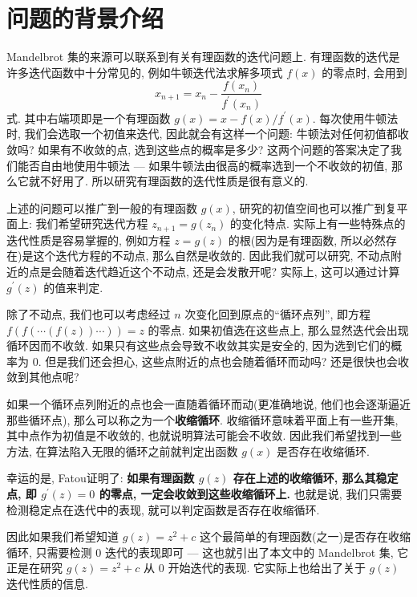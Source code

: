 \documentclass{ctexart}
\begin{document}
\section{问题的背景介绍} %
\label{sec:问题的背景介绍}
Mandelbrot 集的来源可以联系到有关有理函数的迭代问题上. 有理函数的迭代是许多迭代函数中十分常见的, 例如牛顿迭代法求解多项式 $f(x)$ 的零点时, 会用到
\begin{equation}
	x_{n + 1} = x_{n} - \frac{f(x_n)}{f^\prime(x_n)}
\end{equation}
式. 其中右端项即是一个有理函数 $g(x) = x - f(x) / f^\prime(x)$. 每次使用牛顿法时, 我们会选取一个初值来迭代, 因此就会有这样一个问题: 牛顿法对任何初值都收敛吗? 如果有不收敛的点, 选到这些点的概率是多少? 这两个问题的答案决定了我们能否自由地使用牛顿法 --- 如果牛顿法由很高的概率选到一个不收敛的初值, 那么它就不好用了. 所以研究有理函数的迭代性质是很有意义的. \par
上述的问题可以推广到一般的有理函数 $g(x)$, 研究的初值空间也可以推广到复平面上: 我们希望研究迭代方程 $z_{n + 1} = g(z_n)$ 的变化特点. 实际上有一些特殊点的迭代性质是容易掌握的, 例如方程 $z = g(z)$ 的根(因为是有理函数, 所以必然存在)是这个迭代方程的不动点, 那么自然是收敛的. 因此我们就可以研究, 不动点附近的点是会随着迭代趋近这个不动点, 还是会发散开呢? 实际上, 这可以通过计算 $g^\prime(z)$ 的值来判定\cite{tbob-Mandelbrot}. \par
除了不动点, 我们也可以考虑经过 $n$ 次变化回到原点的``循环点列'', 即方程 $f(f(\cdots(f(z))\cdots)) = z$ 的零点. 如果初值选在这些点上, 那么显然迭代会出现循环因而不收敛. 如果只有这些点会导致不收敛其实是安全的, 因为选到它们的概率为 $0$. 但是我们还会担心, 这些点附近的点也会随着循环而动吗? 还是很快也会收敛到其他点呢? \par
如果一个循环点列附近的点也会一直随着循环而动(更准确地说, 他们也会逐渐逼近那些循环点), 那么可以称之为一个\textbf{收缩循环}. 收缩循环意味着平面上有一些开集, 其中点作为初值是不收敛的, 也就说明算法可能会不收敛. 因此我们希望找到一些方法, 在算法陷入无限的循环之前就判定出函数 $g(x)$ 是否存在收缩循环. \par
幸运的是, Fatou\cite{CJGLSD-IterRational, FatouSurL}证明了: \textbf{如果有理函数 $g(z)$ 存在上述的收缩循环, 那么其稳定点, 即 $g^\prime(z) = 0$ 的零点, 一定会收敛到这些收缩循环上.} 也就是说, 我们只需要检测稳定点在迭代中的表现, 就可以判定函数是否存在收缩循环. \par
因此如果我们希望知道 $g(z) = z^2 + c$ 这个最简单的有理函数(之一)是否存在收缩循环, 只需要检测 $0$ 迭代的表现即可 --- 这也就引出了本文中的 Mandelbrot 集, 它正是在研究 $g(z) = z^2 + c$ 从 $0$ 开始迭代的表现. 它实际上也给出了关于 $g(z)$ 迭代性质的信息.
\end{document}
